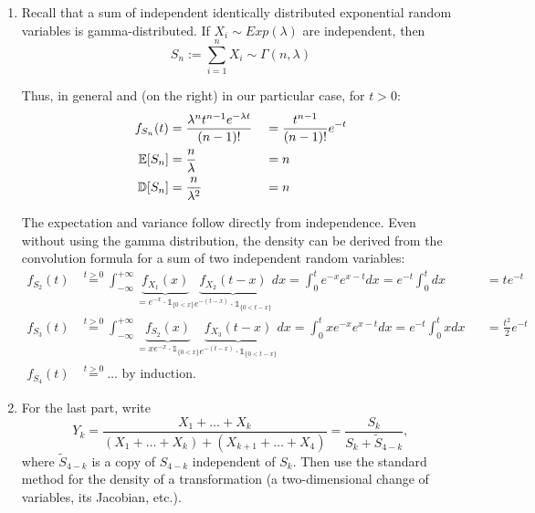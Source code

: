 \documentclass[a4paper]{report}
\begin{document}
\begin{solution}
\begin{enumerate}
        \item Recall that a sum of independent identically distributed exponential random variables is gamma-distributed. If $X_i\sim Exp(\lambda)$ are independent, then
        \[S_n := \sum_{i = 1}^nX_i \sim \Gamma(n, \lambda)\]

        Thus, in general and (on the right) in our particular case, for $t>0$:
        \begin{align*}
            f_{S_n}(t) &= \frac{\lambda^nt^{n-1}e^{-\lambda t}}{(n-1)!} &&= \frac{t^{n-1}}{(n-1)!}e^{-t} \\
            \mathbb {E}[S_n] &= \frac{n}{\lambda} &&= n \\
            \mathbb{D}[S_n] &= \frac{n}{\lambda^2} &&= n
        \end{align*}

        The expectation and variance follow directly from independence. Even without using the gamma distribution, the density can be derived from the convolution formula for a sum of two independent random variables:
        \begin{align*}
            f_{S_2}(t) &\stackrel{t>0}{=} \int_{-\infty}^{+\infty}\underbrace{f_{X_1}(x)}_{=e^{-x}\cdot\mathbb{1}_{\{0<x\}}}\underbrace{f_{X_2}(t-x)}_{e^{-(t-x)}\cdot\mathbb{1}_{\{0 < t - x\}}}dx = \int_0^te^{-x}e^{x-t}dx = e^{-t}\int_0^tdx &&= te^{-t}\\
            f_{S_3}(t) &\stackrel{t>0}{=} \int_{-\infty}^{+\infty}\underbrace{f_{S_2}(x)}_{=xe^{-x}\cdot\mathbb{1}_{\{0<x\}}}\underbrace{f_{X_3}(t-x)}_{e^{-(t-x)}\cdot\mathbb{1}_{\{0 < t - x\}}}dx = \int_0^txe^{-x}e^{x-t}dx = e^{-t}\int_0^txdx &&= \frac{t^2}{2}e^{-t}\\
            f_{S_4}(t)&\stackrel{t>0}{=}\dots\text{ by induction}.
        \end{align*}

        \item For the last part, write
        \[
        Y_k = \frac{X_1 + \dots +  X_k}{(X_1 + \dots + X_k) +
        (X_{k+1} + \dots + X_{4})} = \frac{S_k}{S_k + \widetilde{S}_{4-k}},
        \]
        where $\widetilde S_{4-k}$ is a copy of
        $S_{4-k}$ independent of $S_k$. Then use the standard method
        for the density of a transformation (a two-dimensional change of variables, its Jacobian, etc.).
    \end{enumerate}
\end{solution}
\end{document}
